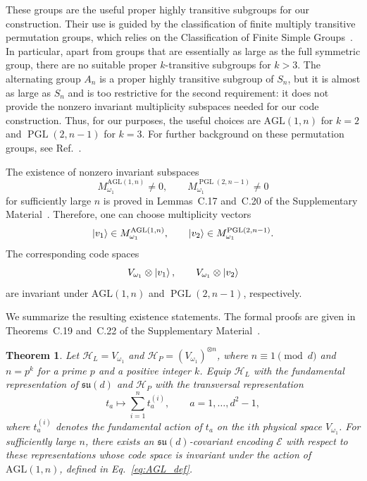 \documentclass[10pt,twocolumn,superscriptaddress,aps,amsmath,amssymb,citeautoscript,floatfix,prx,longbibliography]{revtex4-2}
\newtheorem{theorem}{Theorem}
\theoremstyle{plain}
\theoremstyle{plain}
\theoremstyle{plain}
\theoremstyle{plain}
\theoremstyle{plain}
\theoremstyle{plain}
\begin{document}
These groups are the useful proper highly transitive subgroups for our construction. Their use is guided by the classification of finite multiply transitive permutation groups, which relies on the Classification of Finite Simple Groups~\cite{GorensteinLyonsSolomon1994}. In particular, apart from groups that are essentially as large as the full symmetric group, there are no suitable proper $k$-transitive subgroups for $k>3$. The alternating group $A_n$ is a proper highly transitive subgroup of $S_n$, but it is almost as large as $S_n$ and is too restrictive for the second requirement: it does not provide the nonzero invariant multiplicity subspaces needed for our code construction. Thus, for our purposes, the useful choices are $\mathrm{AGL}(1,n)$ for $k=2$ and $\operatorname{PGL}(2,n-1)$ for $k=3$. For further background on these permutation groups, see Ref.~\cite{DixonMortimer1996}.

The existence of nonzero invariant subspaces
$$
M_{\omega_1}^{\mathrm{AGL}(1,n)}
\neq
0,
\qquad
M_{\omega_1}^{\operatorname{PGL}(2,n-1)}
\neq
0
$$
for sufficiently large $n$ is proved in Lemmas~C.17 and~C.20 of the Supplementary Material~\cite{SuppMat}. Therefore, one can choose multiplicity vectors
$$
\ket{v_1}\in M_{\omega_1}^{\mathrm{AGL}(1,n)},
\qquad
\ket{v_2}\in M_{\omega_1}^{\operatorname{PGL}(2,n-1)}.
$$
The corresponding code spaces
$$
V_{\omega_1}\otimes\ket{v_1},
\qquad
V_{\omega_1}\otimes\ket{v_2}
$$
are invariant under $\mathrm{AGL}(1,n)$ and $\operatorname{PGL}(2,n-1)$, respectively.

We summarize the resulting existence statements. The formal proofs are given in Theorems~C.19 and~C.22 of the Supplementary Material~\cite{SuppMat}.

\begin{theorem}\label{thrm:main_2_transitive_covariant_code}
Let $\mathcal H_L=V_{\omega_1}$ and $\mathcal H_P=(V_{\omega_1})^{\otimes n}$, where $n\equiv 1\pmod d$ and $n=p^k$ for a prime $p$ and a positive integer $k$. Equip $\mathcal H_L$ with the fundamental representation of $\mathfrak{su}(d)$ and $\mathcal H_P$ with the transversal representation
$$
t_a
\longmapsto
\sum_{i=1}^n t_a^{(i)},
\qquad
a=1,\ldots,d^2-1,
$$
where $t_a^{(i)}$ denotes the fundamental action of $t_a$ on the $i$th physical space $V_{\omega_1}$. For sufficiently large $n$, there exists an $\mathfrak{su}(d)$-covariant encoding $\mathcal E$ with respect to these representations whose code space is invariant under the action of $\mathrm{AGL}(1,n)$, defined in Eq.~\eqref{eq:AGL_def}.
\end{theorem}
\end{document}
